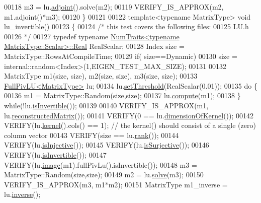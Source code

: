 \begin{DoxyCode}
00118   m3 = lu.\hyperlink{class_eigen_1_1_solver_base_a05a3686a89888681c8e0c2bcab6d1ce5}{adjoint}().solve(m2);
00119   VERIFY\_IS\_APPROX(m2, m1.adjoint()*m3);
00120 \}
00121 
00122 \textcolor{keyword}{template}<\textcolor{keyword}{typename} MatrixType> \textcolor{keywordtype}{void} lu\_invertible()
00123 \{
00124   \textcolor{comment}{/* this test covers the following files:}
00125 \textcolor{comment}{     LU.h}
00126 \textcolor{comment}{  */}
00127   \textcolor{keyword}{typedef} \textcolor{keyword}{typename} \hyperlink{group___core___module_struct_eigen_1_1_num_traits}{NumTraits<typename MatrixType::Scalar>::Real}
       RealScalar;
00128   Index size = MatrixType::RowsAtCompileTime;
00129   \textcolor{keywordflow}{if}( size==Dynamic)
00130     size = internal::random<Index>(1,EIGEN\_TEST\_MAX\_SIZE);
00131 
00132   MatrixType m1(size, size), m2(size, size), m3(size, size);
00133   \hyperlink{group___l_u___module_class_eigen_1_1_full_piv_l_u}{FullPivLU<MatrixType>} lu;
00134   lu.\hyperlink{group___l_u___module_a414592d82de98f5bd075965caf56d681}{setThreshold}(RealScalar(0.01));
00135   \textcolor{keywordflow}{do} \{
00136     m1 = MatrixType::Random(size,size);
00137     lu.\hyperlink{group___l_u___module_a0a3c3b1bbafa31a03567a4573ebabc79}{compute}(m1);
00138   \} \textcolor{keywordflow}{while}(!lu.\hyperlink{group___l_u___module_afdf2579c93473650f2ef2a47a376c4a0}{isInvertible}());
00139 
00140   VERIFY\_IS\_APPROX(m1, lu.\hyperlink{group___l_u___module_a191a4f598b0c192a83ab48984e87ee51}{reconstructedMatrix}());
00141   VERIFY(0 == lu.\hyperlink{group___l_u___module_a64e191225834e91161ea53ad4b78167b}{dimensionOfKernel}());
00142   VERIFY(lu.\hyperlink{group___l_u___module_a70f52eeb2cd07dfbf790fce106fb4015}{kernel}().cols() == 1); \textcolor{comment}{// the kernel() should consist of a single (zero) column vector}
00143   VERIFY(size == lu.\hyperlink{group___l_u___module_a67a870aa69e699e058d04802ba0bdad9}{rank}());
00144   VERIFY(lu.\hyperlink{group___l_u___module_ab13992c852aa593461d9b81790b56667}{isInjective}());
00145   VERIFY(lu.\hyperlink{group___l_u___module_a1f6222875fc3a181ee1544b9b36dfda5}{isSurjective}());
00146   VERIFY(lu.\hyperlink{group___l_u___module_afdf2579c93473650f2ef2a47a376c4a0}{isInvertible}());
00147   VERIFY(lu.\hyperlink{group___l_u___module_a0893985d2dab367baa6e57c6fd0c4956}{image}(m1).fullPivLu().isInvertible());
00148   m3 = MatrixType::Random(size,size);
00149   m2 = lu.\hyperlink{group___l_u___module_af563471f6f3283fd10779ef02dd0b748}{solve}(m3);
00150   VERIFY\_IS\_APPROX(m3, m1*m2);
00151   MatrixType m1\_inverse = lu.\hyperlink{group___l_u___module_ae6f4bb55f859f6353f99cf15ecff4b25}{inverse}();

\end{DoxyCode}
